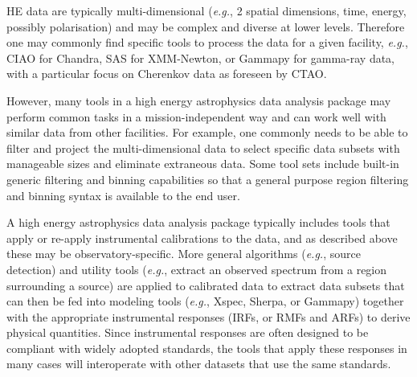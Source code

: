 \documentclass[11pt,a4paper]{ivoa}
\begin{document}
{%
%
%
%
%


\gls{HE} data are typically multi-dimensional ({\em e.g.\/}, 2 spatial dimensions, time, energy, possibly polarisation) and may be complex and diverse at lower levels.  Therefore one may commonly find specific tools to process the data for a given facility, {\em e.g.\/}, CIAO for Chandra, \gls{SAS} for \gls{XMM-Newton}, or Gammapy for gamma-ray data, with a particular focus on Cherenkov data as foreseen by \gls{CTAO}.

However, many tools in a high energy astrophysics data analysis package may perform common tasks in a mission-independent way and can work well with similar data from other facilities.  For example, one commonly needs to be able to filter and project the multi-dimensional data to select specific data subsets with manageable sizes and eliminate extraneous data.  Some tool sets include built-in generic filtering and binning capabilities so that a general purpose region filtering and binning syntax is available to the end user.

A high energy astrophysics data analysis package typically includes tools that apply or re-apply instrumental calibrations to the data, and as described above these may be observatory-specific.  More general algorithms ({\em e.g.\/}, source detection) and utility tools ({\em e.g.\/}, extract an observed spectrum from a region surrounding a source) are applied to calibrated data to extract data subsets that can then be fed into modeling tools ({\em e.g.\/}, Xspec, Sherpa, or Gammapy) together with the appropriate instrumental responses (\gls{IRF}s, or \gls{RMF}s and \gls{ARF}s) to derive physical quantities.  Since instrumental responses are often designed to be compliant with widely adopted standards, the tools that apply these responses in many cases will interoperate with other datasets that use the same standards.

}
\end{document}
